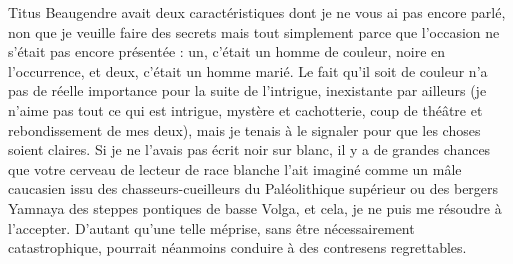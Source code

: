 \label{rat:11}%
Titus Beaugendre avait deux caractéristiques dont je ne vous ai pas encore parlé, non que je veuille faire des secrets mais tout simplement parce que l’occasion ne s’était pas encore présentée : un, c’était un homme de couleur, noire en l’occurrence, et deux, c’était un homme marié. Le fait qu’il soit de couleur n’a pas de réelle importance pour la suite de l’intrigue, inexistante par ailleurs (je n’aime pas tout ce qui est intrigue, mystère et cachotterie, coup de théâtre et rebondissement de mes deux), mais je tenais à le signaler pour que les choses soient claires. Si je ne l’avais pas écrit noir sur blanc, il y a de grandes chances que votre cerveau de lecteur de race blanche l’ait imaginé comme un mâle caucasien issu des chasseurs-cueilleurs du Paléolithique supérieur ou des bergers Yamnaya des steppes pontiques de basse Volga, et cela, je ne puis me résoudre à l’accepter. D’autant qu’une telle méprise, sans être nécessairement catastrophique, pourrait néanmoins conduire à des contresens regrettables. 

%

